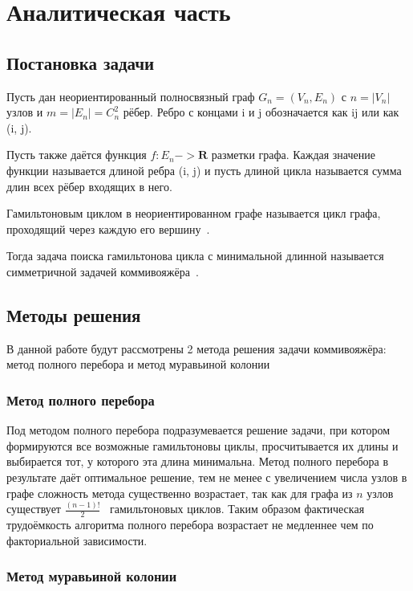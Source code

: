 \chapter{Аналитическая часть}
\section{Постановка задачи}

Пусть дан неориентированный полносвязный граф $G_n = (V_n, E_n)$ с $n = |V_n|$ узлов и $m = |E_n| = C^2_n$ рёбер. Ребро с концами i и j обозначается как ij или как (i, j). 

Пусть также даётся функция $f:E_n -> \mathbf{R}$ разметки графа. Каждая значение функции называется длиной ребра (i, j) и пусть длиной цикла называется сумма длин всех рёбер входящих в него.

Гамильтоновым циклом в неориентированном графе называется цикл графа, проходящий через каждую его вершину~\cite{graphs}.

Тогда задача поиска гамильтонова цикла с минимальной длинной называется симметричной задачей коммивояжёра~\cite{tsp}.

\section{Методы решения}

В данной работе будут рассмотрены 2 метода решения задачи коммивояжёра: метод полного перебора и метод муравьиной колонии

\subsection{Метод полного перебора}

Под методом полного перебора подразумевается решение задачи, при котором формируются все возможные гамильтоновы циклы, просчитывается их длины и выбирается тот, у которого эта длина минимальна. Метод полного перебора в результате даёт оптимальное решение, тем не менее с увеличением числа узлов в графе сложность метода существенно возрастает, так как для графа из $n$ узлов существует $\frac{(n-1)!}{2}$~\cite{tsp} гамильтоновых циклов. Таким образом фактическая трудоёмкость алгоритма полного перебора возрастает не медленнее чем по факториальной зависимости.

\subsection{Метод муравьиной колонии}

